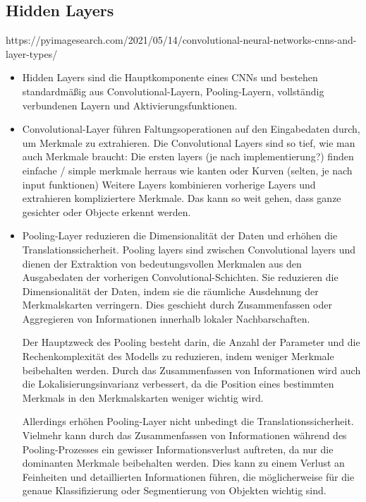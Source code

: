 \subsection{Hidden Layers}

https://pyimagesearch.com/2021/05/14/convolutional-neural-networks-cnns-and-layer-types/


\begin{itemize}
  \item Hidden Layers sind die Hauptkomponente eines CNNs und bestehen standardmäßig aus Convolutional-Layern, Pooling-Layern, vollständig verbundenen Layern und Aktivierungsfunktionen.
  \item Convolutional-Layer führen Faltungsoperationen auf den Eingabedaten durch, um Merkmale zu extrahieren.
  \subitem Die Convolutional Layers sind so tief, wie man auch Merkmale braucht: Die ersten layers (je nach implementierung?) finden einfache / simple merkmale herraus wie kanten oder Kurven (selten, je nach input funktionen)
  \subitem Weitere Layers kombinieren vorherige Layers und extrahieren kompliziertere Merkmale.
  \subitem Das kann so weit gehen, dass ganze gesichter oder Objecte erkennt werden. 
  \item Pooling-Layer reduzieren die Dimensionalität der Daten und erhöhen die Translationssicherheit.
  \subitem Pooling layers sind zwischen Convolutional layers und dienen der Extraktion von bedeutungsvollen Merkmalen aus den Ausgabedaten der vorherigen Convolutional-Schichten. Sie reduzieren die Dimensionalität der Daten, indem sie die räumliche Ausdehnung der Merkmalskarten verringern. Dies geschieht durch Zusammenfassen oder Aggregieren von Informationen innerhalb lokaler Nachbarschaften.

Der Hauptzweck des Pooling besteht darin, die Anzahl der Parameter und die Rechenkomplexität des Modells zu reduzieren, indem weniger Merkmale beibehalten werden. Durch das Zusammenfassen von Informationen wird auch die Lokalisierungsinvarianz verbessert, da die Position eines bestimmten Merkmals in den Merkmalskarten weniger wichtig wird.

Allerdings erhöhen Pooling-Layer nicht unbedingt die Translationssicherheit. Vielmehr kann durch das Zusammenfassen von Informationen während des Pooling-Prozesses ein gewisser Informationsverlust auftreten, da nur die dominanten Merkmale beibehalten werden. Dies kann zu einem Verlust an Feinheiten und detaillierten Informationen führen, die möglicherweise für die genaue Klassifizierung oder Segmentierung von Objekten wichtig sind.


\end{itemize}
